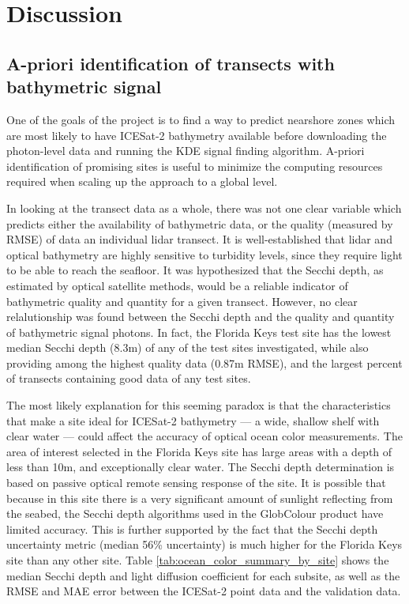\chapter{Discussion}

\section{A-priori identification of transects with bathymetric signal}
One of the goals of the project is to find a way to predict nearshore zones which are most likely to have ICESat-2 bathymetry available before downloading the photon-level data and running the KDE signal finding algorithm. A-priori identification of promising sites is useful to minimize the computing resources required when scaling up the approach to a global level.

In looking at the transect data as a whole, there was not one clear variable which predicts either the availability of bathymetric data, or the quality  (measured by RMSE) of data an individual lidar transect. It is well-established that lidar and optical bathymetry are highly sensitive to turbidity levels, since they require light to be able to reach the seafloor. It was hypothesized that the Secchi depth, as estimated by optical satellite methods, would be a reliable indicator of bathymetric quality and quantity for a given transect. However, no clear relalutionship was found between the Secchi depth and the quality and quantity of bathymetric signal photons. In fact, the Florida Keys test site has the lowest median Secchi depth (8.3m) of any of the test sites investigated, while also providing among the highest quality data (0.87m RMSE), and the largest percent of transects containing good data of any test sites. 

The most likely explanation for this seeming paradox is that the characteristics that make a site ideal for ICESat-2 bathymetry --- a wide, shallow shelf with clear water --- could affect the accuracy of optical ocean color measurements. The area of interest selected in the Florida Keys site has large areas with a depth of less than 10m, and exceptionally clear water. The Secchi depth determination is based on passive optical remote sensing response of the site. It is possible that because in this site there is a very significant amount of sunlight reflecting from the seabed, the Secchi depth algorithms used in the GlobColour product have limited accuracy. This is further supported by the fact that the Secchi depth uncertainty metric (median 56\% uncertainty) is much higher for the Florida Keys site than any other site. Table \ref{tab:ocean_color_summary_by_site} shows the median Secchi depth and light diffusion coefficient for each subsite, as well as the RMSE and MAE error between the ICESat-2 point data and the validation data.



